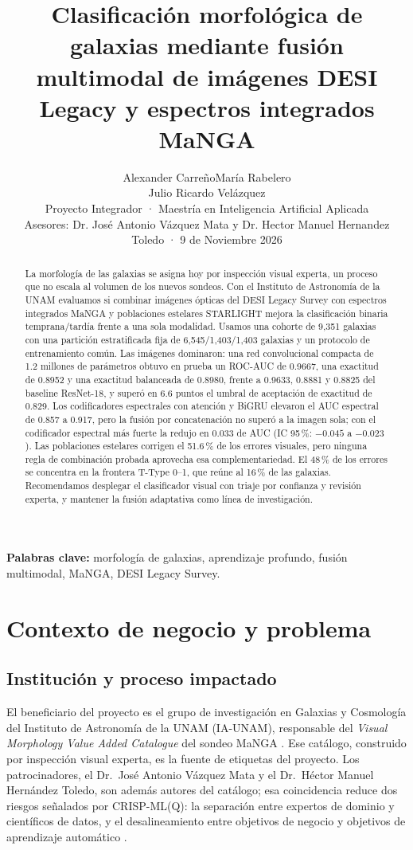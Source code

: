 \documentclass[letterpaper,11pt]{article}
\title{\textbf{Clasificación morfológica de galaxias mediante fusión multimodal de imágenes DESI Legacy y espectros integrados MaNGA}}
\author{Alexander Carreño\quad María Rabelero\\[2pt] Julio Ricardo Velázquez\\[6pt]
  \normalsize Proyecto Integrador · Maestría en Inteligencia Artificial Aplicada \\[6pt]
  \normalsize Asesores: Dr. José Antonio Vázquez Mata y Dr. Hector Manuel Hernandez Toledo · 9 de Noviembre 2026}
\date{\vspace{-2ex}}
\begin{document}
\maketitle
\begin{abstract}
La morfología de las galaxias se asigna hoy por inspección visual experta, un proceso que no escala al volumen de los nuevos sondeos. Con el Instituto de Astronomía de la UNAM evaluamos si combinar imágenes ópticas del DESI Legacy Survey con espectros integrados MaNGA y poblaciones estelares STARLIGHT mejora la clasificación binaria temprana/tardía frente a una sola modalidad. Usamos una cohorte de 9,351 galaxias con una partición estratificada fija de 6,545/1,403/1,403 galaxias y un protocolo de entrenamiento común. Las imágenes dominaron: una red convolucional compacta de 1.2 millones de parámetros obtuvo en prueba un ROC-AUC de 0.9667, una exactitud de 0.8952 y una exactitud balanceada de 0.8980, frente a 0.9633, 0.8881 y 0.8825 del baseline ResNet-18, y superó en 6.6 puntos el umbral de aceptación de exactitud de 0.829. Los codificadores espectrales con atención y BiGRU elevaron el AUC espectral de 0.857 a 0.917, pero la fusión por concatenación no superó a la imagen sola; con el codificador espectral más fuerte la redujo en 0.033 de AUC (IC 95\,\%: $-0.045$ a $-0.023$). Las poblaciones estelares corrigen el 51.6\,\% de los errores visuales, pero ninguna regla de combinación probada aprovecha esa complementariedad. El 48\,\% de los errores se concentra en la frontera T-Type 0--1, que reúne al 16\,\% de las galaxias. Recomendamos desplegar el clasificador visual con triaje por confianza y revisión experta, y mantener la fusión adaptativa como línea de investigación.
\end{abstract}

\noindent\textbf{Palabras clave:} morfología de galaxias, aprendizaje profundo, fusión multimodal, MaNGA, DESI Legacy Survey.

\section{Contexto de negocio y problema}

\subsection{Institución y proceso impactado}
El beneficiario del proyecto es el grupo de investigación en Galaxias y Cosmología del Instituto de Astronomía de la UNAM (IA-UNAM), responsable del \emph{Visual Morphology Value Added Catalogue} del sondeo MaNGA \parencite{vazquezmata2022, bundy2015}. Ese catálogo, construido por inspección visual experta, es la fuente de etiquetas del proyecto. Los patrocinadores, el Dr.~José Antonio Vázquez Mata y el Dr.~Héctor Manuel Hernández Toledo, son además autores del catálogo; esa coincidencia reduce dos riesgos señalados por CRISP-ML(Q): la separación entre expertos de dominio y científicos de datos, y el desalineamiento entre objetivos de negocio y objetivos de aprendizaje automático \parencite{studer2021}.
\end{document}
